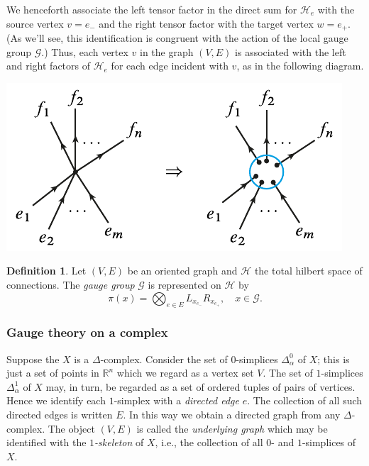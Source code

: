\documentclass[12pt]{amsart}
\theoremstyle{definition}
\newtheorem{definition}[theorem]{Definition}
\theoremstyle{remark}
\numberwithin{equation}{section}
\begin{document}
We henceforth associate the left tensor factor in the direct sum for $\mathcal{H}_e$ with the source vertex $v = e_-$  and the right tensor factor with the target vertex $w = e_+$. (As we'll see, this identification is congruent with the action of the local gauge group $\mathcal{G}$.) Thus, each vertex $v$ in the graph $(V,E)$ is associated with the left and right factors of $\mathcal{H}_e$ for each edge incident with $v$, as in the following diagram.
\begin{center}
	\includegraphics{vertexspace.pdf}
\end{center}

\begin{definition}
	Let $(V,E)$ be an oriented graph and $\mathcal{H}$ the total hilbert space of connections. The \emph{gauge group} $\mathcal{G}$ is represented on $\mathcal{H}$ by 
	\begin{equation}
		\pi(x) = \bigotimes_{e\in E} L_{x_{e_-}}R_{x_{e_+}}, \quad x\in \mathcal{G}.
	\end{equation}
\end{definition}

\subsubsection{Gauge theory on a complex}
Suppose the $X$ is a $\Delta$-complex. Consider the set of $0$-simplices $\Delta^0_\alpha$ of $X$; this is just a set of points in $\mathbb{R}^n$ which we regard as a vertex set $V$. The set of $1$-simplices $\Delta_\alpha^1$ of $X$ may, in turn, be regarded as a set of ordered tuples of pairs of vertices. Hence we identify each $1$-simplex with a \emph{directed edge} $e$. The collection of all such directed edges is written $E$. In this way we obtain a directed graph from any $\Delta$-complex. The object $(V,E)$ is called the \emph{underlying graph} which may be identified with the \emph{$1$-skeleton} of $X$, i.e., the collection of all $0$- and $1$-simplices of $X$.
\end{document}
